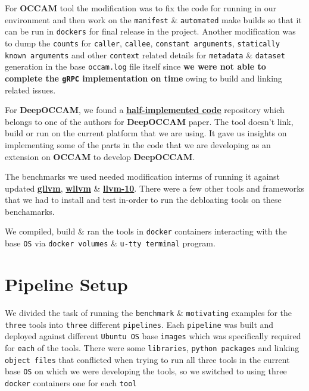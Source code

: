 \documentclass{relatorio}
\begin{document}
For \textbf{OCCAM} tool the modification was to fix the code for running in our environment and then work on the \texttt{manifest} \& \texttt{automated} make builds so that it can be run in \texttt{dockers} for final release in the project. Another modification was to dump the \texttt{counts} for \texttt{caller}, \texttt{callee}, \texttt{constant arguments}, \texttt{statically known arguments} and other \texttt{context} related details for 
\texttt{metadata} \& \texttt{dataset} generation in the base \texttt{occam.log} file itself since \textbf{we were not able to complete the \texttt{gRPC} implementation on time} owing to build and linking related issues. 

For \textbf{DeepOCCAM}, we found a \textbf{\href{https://github.com/nhamlv-55/OCCAM/tree/mlpolicy}{half-implemented code}} repository which belongs to one of the authors for \textbf{DeepOCCAM} paper. The tool doesn't link, build or run on the current platform that we are using. It gave us insights on implementing some of the parts in the code that we are developing as an extension on \textbf{OCCAM} to develop \textbf{DeepOCCAM}.

The benchmarks we used needed modification interms of running it against updated \textbf{\href{https://github.com/SRI-CSL/gllvm}{gllvm}}, \textbf{\href{https://github.com/SRI-CSL/whole-program-llvm}{wllvm}} \& \textbf{\href{https://github.com/lahiri-phdworks/llvm-project/tree/release/10.x}{llvm-10}}. There were a few other tools and frameworks that we had to install and test in-order to run the debloating tools on these benchamarks. 

We compiled, build \& ran the tools in \texttt{docker} containers interacting with the base \texttt{OS} via \texttt{docker volumes} \& \texttt{u-tty terminal} program.

\section{Pipeline Setup}%
\label{Tools}

We divided the task of running the \texttt{benchmark} \& \texttt{motivating} examples for the \texttt{three} tools into \texttt{three} different \texttt{pipelines}. Each \texttt{pipeline} was built and deployed against different \texttt{Ubuntu OS} base \texttt{images} which was specifically required for \texttt{each} of the tools. There were some \texttt{libraries}, \texttt{python packages} and linking \texttt{object files} that conflicted when trying to run all three tools in the current base \texttt{OS} on which we were developing the tools, so we switched to using three \texttt{docker} containers one for each \texttt{tool} 
\end{document}
